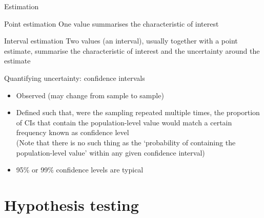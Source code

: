 \begin{frame}{Estimation}
    \begin{block}{Point estimation}
        One value summarises the characteristic of interest
    \end{block}
    \vfill
    \begin{block}{Interval estimation}
        Two values (an interval), usually together with a point estimate,
        summarise the characteristic of interest and the \alert{uncertainty}
        around the estimate
    \end{block}
\end{frame}

\begin{frame}{Quantifying uncertainty: confidence intervals}
    \begin{itemize}
        \item \alert{Observed} (may change from sample to sample) \\[\bigskipamount]
        \item Defined such that, \alert{were the sampling repeated multiple
              times}, the proportion of CIs that contain the
              population\hyp{}level value would match a certain frequency known
              as confidence level \\
              {\small%
               (Note that there is no such thing as the `probability of
                containing the population\hyp{}level value' within any given
                confidence interval)} \\[\bigskipamount]
        \item 95\% or 99\% confidence levels are typical \\[\bigskipamount]
    \end{itemize}
\end{frame}

\section{Hypothesis testing}

